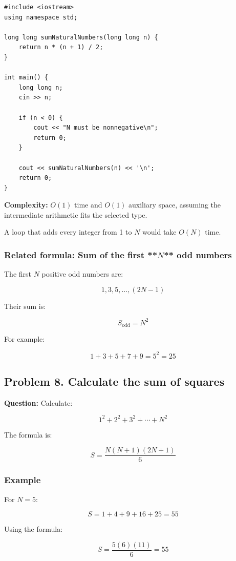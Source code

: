 \begin{lstlisting}[style=cppstyle]
#include <iostream>
using namespace std;

long long sumNaturalNumbers(long long n) {
    return n * (n + 1) / 2;
}

int main() {
    long long n;
    cin >> n;

    if (n < 0) {
        cout << "N must be nonnegative\n";
        return 0;
    }

    cout << sumNaturalNumbers(n) << '\n';
    return 0;
}
\end{lstlisting}

\textbf{Complexity:} $O(1)$ time and $O(1)$ auxiliary space, assuming the intermediate arithmetic fits the selected type.

A loop that adds every integer from 1 to $N$ would take $O(N)$ time.

\subsubsection{Related formula: Sum of the first **$N$** odd numbers}

The first $N$ positive odd numbers are:


\[
1,3,5,\ldots,(2N-1)
\]


Their sum is:


\[
\boxed{S_{\text{odd}}=N^2}
\]


For example:


\[
1+3+5+7+9=5^2=\boxed{25}
\]


\subsection{Problem 8. Calculate the sum of squares}

\textbf{Question:} Calculate:


\[
1^2+2^2+3^2+\cdots+N^2
\]


The formula is:


\[
\boxed{S=\frac{N(N+1)(2N+1)}6}
\]


\subsubsection{Example}

For $N=5$:


\[
S=1+4+9+16+25=55
\]


Using the formula:


\[
S=\frac{5(6)(11)}6=\boxed{55}
\]


